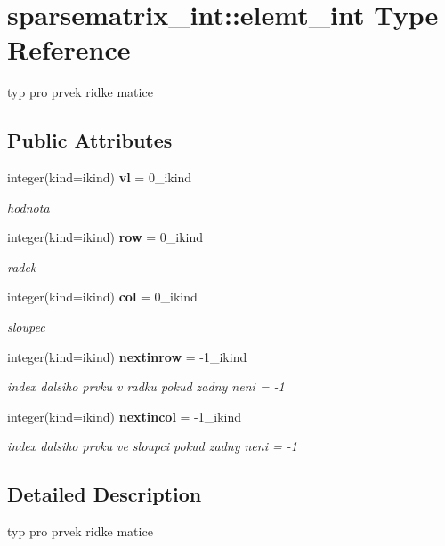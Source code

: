 \section{sparsematrix\+\_\+int\+:\+:elemt\+\_\+int Type Reference}
\label{structsparsematrix__int_1_1elemt__int}


typ pro prvek ridke matice  


\subsection*{Public Attributes}
\begin{DoxyCompactItemize}
\item 
integer(kind=ikind) {\bf vl} = 0\+\_\+ikind
\begin{DoxyCompactList}\small\item\em hodnota \end{DoxyCompactList}\item 
integer(kind=ikind) {\bf row} = 0\+\_\+ikind
\begin{DoxyCompactList}\small\item\em radek \end{DoxyCompactList}\item 
integer(kind=ikind) {\bf col} = 0\+\_\+ikind
\begin{DoxyCompactList}\small\item\em sloupec \end{DoxyCompactList}\item 
integer(kind=ikind) {\bf nextinrow} = -\/1\+\_\+ikind
\begin{DoxyCompactList}\small\item\em index dalsiho prvku v radku pokud zadny neni = -\/1 \end{DoxyCompactList}\item 
integer(kind=ikind) {\bf nextincol} = -\/1\+\_\+ikind
\begin{DoxyCompactList}\small\item\em index dalsiho prvku ve sloupci pokud zadny neni = -\/1 \end{DoxyCompactList}\end{DoxyCompactItemize}


\subsection{Detailed Description}
typ pro prvek ridke matice 

